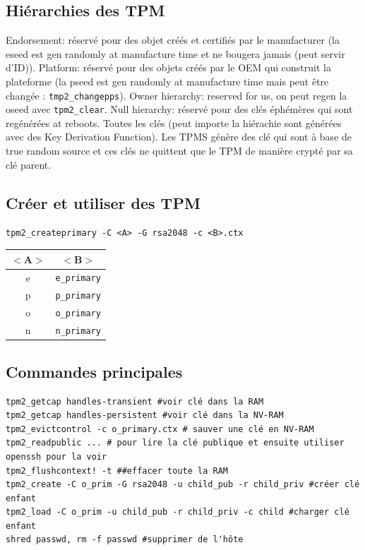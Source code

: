 \subsection{Hiérarchies des TPM}
Endorsement: réservé pour des objet créés et certifiés par le manufacturer (la eseed est gen randomly at manufacture time et ne bougera jamais (peut servir d'ID)). Platform: réservé pour des objets créés par le OEM qui construit la plateforme (la pseed est gen randomly at manufacture time mais peut être changée : \verb!tmp2_changepps!). Owner hierarchy: reserved for us, on peut regen la oseed avec \verb!tpm2_clear!. Null hierarchy: réservé pour des clés éphémères qui sont regénérées at reboots. Toutes les clés (peut importe la hiérachie sont générées avec des Key Derivation Function). Les TPMS génère des clé qui sont à base de true random source et ces clés ne quittent que le TPM de manière crypté par sa clé parent.

\subsection{Créer et utiliser des TPM}
\begin{center}
\verb!tpm2_createprimary -C <A> -G rsa2048 -c <B>.ctx!\\
\begin{tabular}{cc}
$<$A$>$ & $<$B$>$ \\\hline
e & \verb!e_primary!\\
p & \verb!p_primary!\\
o & \verb!o_primary!\\
n & \verb!n_primary!
\end{tabular}
\end{center}

\subsection{Commandes principales}
\begin{lstlisting}[style=bash]
tpm2_getcap handles-transient #voir clé dans la RAM
tpm2_getcap handles-persistent #voir clé dans la NV-RAM
tpm2_evictcontrol -c o_primary.ctx # sauver une clé en NV-RAM
tpm2_readpublic ... # pour lire la clé publique et ensuite utiliser openssh pour la voir
tpm2_flushcontext! -t ##effacer toute la RAM
tpm2_create -C o_prim -G rsa2048 -u child_pub -r child_priv #créer clé enfant
tpm2_load -C o_prim -u child_pub -r child_priv -c child #charger clé enfant
shred passwd, rm -f passwd #supprimer de l'hôte

\end{lstlisting}

